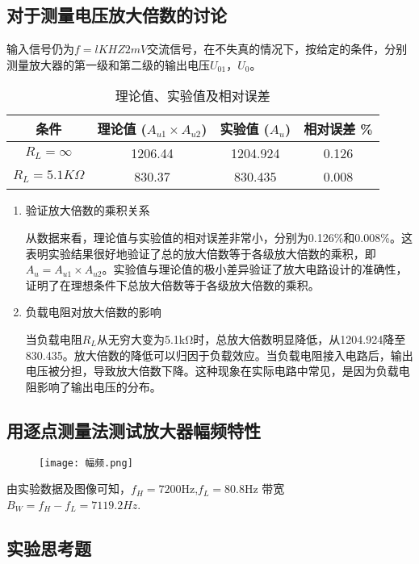 \documentclass[dvipsnames, svgnames,a4paper,11pt]{article}
\begin{document}
	\subsection{对于测量电压放大倍数的讨论}
	输入信号仍为$f=lKHZ$\quad $2mV$交流信号，在不失真的情况下，按给定的条件，分别测量放大器的第一级和第二级的输出电压$U_{01}$，$U_0$。
	\begin{table}[ht]
		\centering
		\caption{理论值、实验值及相对误差}
		\begin{tabular}{|c|c|c|c|}
		\hline
		条件 & 理论值 ($A_{u1} \times A_{u2}$) & 实验值 ($A_u$) & 相对误差 \% \\
		\hline
		$R_L=\infty$ & 1206.44 & 1204.924 & 0.126 \\
		\hline
		$R_L=5.1K\Omega$ & 830.37 & 830.435 & 0.008 \\
		\hline
		\end{tabular}
		\end{table}
		\begin{enumerate}
			\item 验证放大倍数的乘积关系
			
			从数据来看，理论值与实验值的相对误差非常小，分别为0.126\%和0.008\%。这表明实验结果很好地验证了总的放大倍数等于各级放大倍数的乘积，即$A_u = A_{u1} \times A_{u2}$。实验值与理论值的极小差异验证了放大电路设计的准确性，证明了在理想条件下总放大倍数等于各级放大倍数的乘积。
			\item 负载电阻对放大倍数的影响
			
			当负载电阻$R_L$从无穷大变为5.1kΩ时，总放大倍数明显降低，从1204.924降至830.435。放大倍数的降低可以归因于负载效应。当负载电阻接入电路后，输出电压被分担，导致放大倍数下降。这种现象在实际电路中常见，是因为负载电阻影响了输出电压的分布。
		\end{enumerate}
		
	\subsection{ 用逐点测量法测试放大器幅频特性}
	\begin{figure}[{H}]
		\centering
		\texttt{[image: 幅频.png]}
		\label{}
	\end{figure}
	由实验数据及图像可知，$f_H=7200$Hz,$f_L=80.8$Hz
	带宽$B_W=f_H-f_{L}=7119.2Hz$.

	
	
	\subsection{实验思考题}
	
\end{document}

